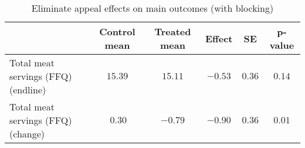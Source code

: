 \begin{table*}[ht]
\caption{Eliminate appeal effects on main outcomes (with blocking)\label{round}} 
\begin{center}
\begin{tabular}{lccccc}
\hline\hline
\multicolumn{1}{l}{}&\multicolumn{1}{c}{Control mean}&\multicolumn{1}{c}{Treated mean}&\multicolumn{1}{c}{Effect}&\multicolumn{1}{c}{SE}&\multicolumn{1}{c}{p-value}\tabularnewline
\hline
Total meat servings (FFQ) (endline)&$15.39$&$15.11$&$-0.53$&$0.36$&$0.14$\tabularnewline
Total meat servings (FFQ) (change)&$~0.30$&$-0.79$&$-0.90$&$0.36$&$0.01$\tabularnewline
\hline
\end{tabular}\end{center}

\end{table*}
